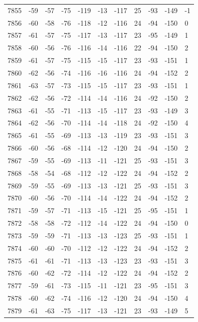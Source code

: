 \begin{table}[H]
\begin{tabular}{lllllllllll}
7855 & -59 & -57 & -75 & -119 & -13 & -117 & 25 & -93 & -149 & -1 \\
7856 & -60 & -58 & -76 & -118 & -12 & -116 & 24 & -94 & -150 & 0 \\
7857 & -61 & -57 & -75 & -117 & -13 & -117 & 23 & -95 & -149 & 1 \\
7858 & -60 & -56 & -76 & -116 & -14 & -116 & 22 & -94 & -150 & 2 \\
7859 & -61 & -57 & -75 & -115 & -15 & -117 & 23 & -93 & -151 & 1 \\
7860 & -62 & -56 & -74 & -116 & -16 & -116 & 24 & -94 & -152 & 2 \\
7861 & -63 & -57 & -73 & -115 & -15 & -117 & 23 & -93 & -151 & 1 \\
7862 & -62 & -56 & -72 & -114 & -14 & -116 & 24 & -92 & -150 & 2 \\
7863 & -61 & -55 & -71 & -113 & -15 & -117 & 23 & -93 & -149 & 3 \\
7864 & -62 & -56 & -70 & -114 & -14 & -118 & 24 & -92 & -150 & 4 \\
7865 & -61 & -55 & -69 & -113 & -13 & -119 & 23 & -93 & -151 & 3 \\
7866 & -60 & -56 & -68 & -114 & -12 & -120 & 24 & -94 & -150 & 2 \\
7867 & -59 & -55 & -69 & -113 & -11 & -121 & 25 & -93 & -151 & 3 \\
7868 & -58 & -54 & -68 & -112 & -12 & -122 & 24 & -94 & -152 & 2 \\
7869 & -59 & -55 & -69 & -113 & -13 & -121 & 25 & -93 & -151 & 3 \\
7870 & -60 & -56 & -70 & -114 & -14 & -122 & 24 & -94 & -152 & 2 \\
7871 & -59 & -57 & -71 & -113 & -15 & -121 & 25 & -95 & -151 & 1 \\
7872 & -58 & -58 & -72 & -112 & -14 & -122 & 24 & -94 & -150 & 0 \\
7873 & -59 & -59 & -71 & -113 & -13 & -123 & 25 & -93 & -151 & 1 \\
7874 & -60 & -60 & -70 & -112 & -12 & -122 & 24 & -94 & -152 & 2 \\
7875 & -61 & -61 & -71 & -113 & -13 & -123 & 23 & -93 & -151 & 3 \\
7876 & -60 & -62 & -72 & -114 & -12 & -122 & 24 & -94 & -152 & 2 \\
7877 & -59 & -61 & -73 & -115 & -11 & -121 & 23 & -95 & -151 & 3 \\
7878 & -60 & -62 & -74 & -116 & -12 & -120 & 24 & -94 & -150 & 4 \\
7879 & -61 & -63 & -75 & -117 & -13 & -121 & 23 & -93 & -149 & 5 \\

\end{tabular}
\end{table}
